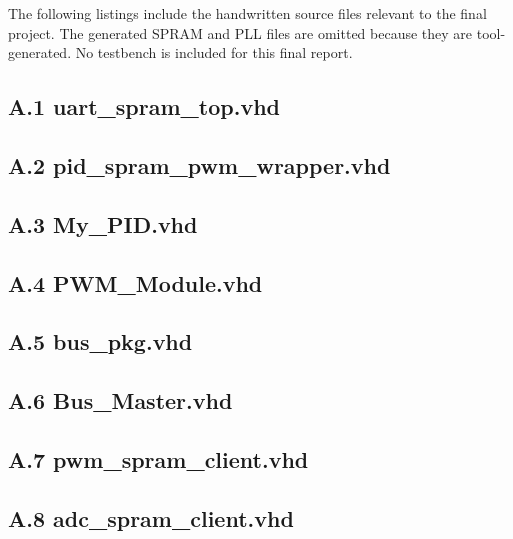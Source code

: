 \documentclass[12pt]{article}
\begin{document}
The following listings include the handwritten source files relevant to the final project. The generated SPRAM and PLL files are omitted because they are tool-generated. No testbench is included for this final report.

\subsection*{A.1 uart\_spram\_top.vhd}


\subsection*{A.2 pid\_spram\_pwm\_wrapper.vhd}


\subsection*{A.3 My\_PID.vhd}


\subsection*{A.4 PWM\_Module.vhd}


\subsection*{A.5 bus\_pkg.vhd}


\subsection*{A.6 Bus\_Master.vhd}


\subsection*{A.7 pwm\_spram\_client.vhd}


\subsection*{A.8 adc\_spram\_client.vhd}

\end{document}
